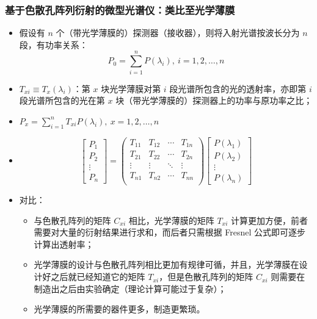 \begin{frame}[c]
    \frametitle{基于色散孔阵列衍射的微型光谱仪：类比至光学薄膜}
    \begin{itemize}
        \item 假设有 $n$ 个（带光学薄膜的）探测器（接收器），则将入射光谱按波长分为 $n$ 段，有功率关系：\[P_0=\sum^{n}_{i=1}P(\lambda_i),\ i=1,2,\dots,n\]
        \item $T_{xi}\equiv T_{x}(\lambda_i)$：第 $x$ 块光学薄膜对第 $i$ 段光谱所包含的光的透射率，亦即第 $i$ 段光谱所包含的光在第 $x$ 块（带光学薄膜的）探测器上的功率与原功率之比；
        \item $P_x=\sum^{n}_{i=1}T_{xi}P(\lambda_i),\ x=1,2,\dots,n$
        \item \[\begin{bmatrix}
                      P_1 \\P_2\\ \vdots \\ P_n
                  \end{bmatrix}=\begin{pmatrix}
                      T_{11} & T_{12} & \cdots & T_{1n} \\
                      T_{21} & T_{22} & \cdots & T_{2n} \\
                      \vdots & \vdots & \ddots & \vdots \\
                      T_{n1} & T_{n2} & \cdots & T_{nn} \\
                  \end{pmatrix}\begin{bmatrix}
                      P(\lambda_1) \\P(\lambda_2)\\ \vdots \\ P(\lambda_n)
                  \end{bmatrix}\]
        \item 对比：\begin{itemize}
                  \item 与色散孔阵列的矩阵 $C_{xi}$ 相比，光学薄膜的矩阵 $T_{xi}$ 计算更加方便，前者需要对大量的衍射结果进行求和，而后者只需根据 Fresnel 公式即可逐步计算出透射率；
                  \item 光学薄膜的设计与色散孔阵列相比更加有规律可循，并且，光学薄膜在设计好之后就已经知道它的矩阵 $T_{xi}$，但是色散孔阵列的矩阵 $C_{xi}$ 则需要在制造出之后由实验确定（理论计算可能过于复杂）；
                  \item 光学薄膜的所需要的器件更多，制造更繁琐。
              \end{itemize}
    \end{itemize}
\end{frame}